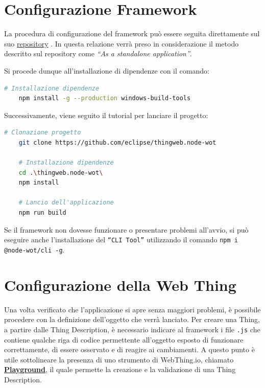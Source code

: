 \documentclass[12pt,a4paper,openright,oneside]{report}
\newcommand{\quotes}[1]{``#1''}
\begin{document}
\clearpage


\section{Configurazione Framework}
La procedura di configurazione del framework può essere seguita direttamente sul suo \href{https://github.com/eclipse/thingweb.node-wot/}{repository} \cite{thingweb}. In questa relazione verrà preso in considerazione il metodo descritto sul repository come \textit{\quotes{As a standalone application}}.

Si procede dunque all'installazione di dipendenze con il comando:
\begin{lstlisting}[language=bash]
	# Installazione dipendenze
	npm install -g --production windows-build-tools
\end{lstlisting}

Successivamente, viene seguito il tutorial per lanciare il progetto:
\begin{lstlisting}[language=bash]
	# Clonazione progetto
	git clone https://github.com/eclipse/thingweb.node-wot
	
	# Installazione dipendenze
	cd .\thingweb.node-wot\
	npm install
	
	# Lancio dell'applicazione
	npm run build
\end{lstlisting}

Se il framework non dovesse funzionare o presentare problemi all'avvio, si può eseguire anche l'installazione del \texttt{\quotes{CLI Tool}} utilizzando il comando \texttt{npm i @node-wot/cli -g}. 


\section{Configurazione della Web Thing}
\label{sec:configuring:wt}
Una volta verificato che l'applicazione si apre senza maggiori problemi, è possibile procedere con la definizione dell'oggetto che verrà lanciato. Per creare una Thing, a partire dalle Thing Description, è necessario indicare al framework i file \texttt{.js} che contiene qualche riga di codice permettente all'oggetto esposto di funzionare correttamente, di essere osservato e di reagire ai cambiamenti. A questo punto è utile sottolineare la presenza di uno strumento di WebThing.io, chiamato \href{http://plugfest.thingweb.io/playground/}{\textbf{Playground}}, il quale permette la creazione e la validazione di una Thing Description.\\
\end{document}

